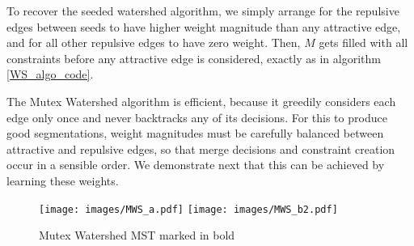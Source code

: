 To recover the seeded watershed algorithm, we simply arrange for the repulsive edges between seeds to have higher weight magnitude than any attractive edge, and for all other repulsive edges to have zero weight. Then, $M$ gets filled with all constraints before any attractive edge is considered, exactly as in algorithm \ref{WS_algo_code}.

The Mutex Watershed algorithm is efficient, because it greedily considers each edge only once and never backtracks any of its decisions. For this to produce good segmentations, weight magnitudes must be carefully balanced between attractive and repulsive edges, so that merge decisions and constraint creation occur in a sensible order. We demonstrate next that this can be achieved by learning these weights.

\begin{figure}[t]
\centering
\texttt{[image: images/MWS\_a.pdf]}
\texttt{[image: images/MWS\_b2.pdf]}
   \caption{Mutex Watershed MST marked in bold}
\label{fig:WS_compare}
\end{figure}





